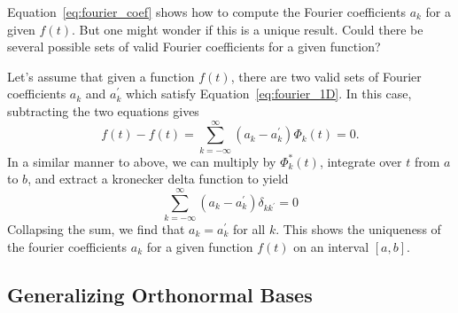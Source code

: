 Equation~\ref{eq:fourier_coef} shows how to compute the Fourier coefficients
$a_k$ for a given $f(t)$.  But one might wonder if this is a unique result.
Could there be several possible sets of valid Fourier coefficients for
a given function?

Let's assume that given a function $f(t)$, there are two valid sets of
Fourier coefficients $a_k$ and $a^\prime_k$ which satisfy
Equation~\ref{eq:fourier_1D}.  In this case, subtracting the two equations
gives
\begin{equation}
  f(t) - f(t) = \sum_{k=-\infty}^\infty (a_k - a^\prime_k)\Phi_k(t) = 0.
\end{equation}
In a similar manner to above, we can multiply by $\Phi^\ast_k(t)$, integrate
over $t$ from $a$ to $b$, and extract a kronecker delta function to
yield
\begin{equation}
  \sum_{k=-\infty}^\infty (a_k - a^\prime_k) \delta_{kk^\prime} = 0
\end{equation}
Collapsing the sum, we find that $a_k = a^\prime_k$ for all $k$.  This
shows the uniqueness of the fourier coefficients $a_k$ for a given function
$f(t)$ on an interval $[a, b]$.

\subsection{Generalizing Orthonormal Bases}


